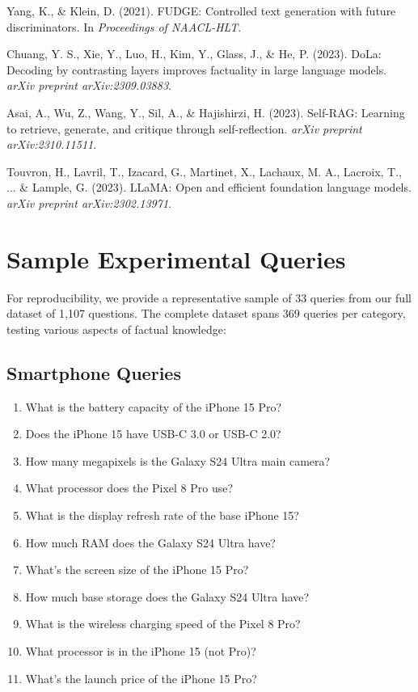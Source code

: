 \documentclass[11pt, a4paper]{article}
\theoremstyle{definition}
\begin{document}
\begin{thebibliography}{99}
Yang, K., \& Klein, D. (2021). 
FUDGE: Controlled text generation with future discriminators. 
In \textit{Proceedings of NAACL-HLT}.

Chuang, Y. S., Xie, Y., Luo, H., Kim, Y., Glass, J., \& He, P. (2023). 
DoLa: Decoding by contrasting layers improves factuality in large language models. 
\textit{arXiv preprint arXiv:2309.03883}.

Asai, A., Wu, Z., Wang, Y., Sil, A., \& Hajishirzi, H. (2023). 
Self-RAG: Learning to retrieve, generate, and critique through self-reflection. 
\textit{arXiv preprint arXiv:2310.11511}.

Touvron, H., Lavril, T., Izacard, G., Martinet, X., Lachaux, M. A., Lacroix, T., ... \& Lample, G. (2023). 
LLaMA: Open and efficient foundation language models. 
\textit{arXiv preprint arXiv:2302.13971}.

\end{thebibliography}

\appendix

\section{Sample Experimental Queries}

For reproducibility, we provide a representative sample of 33 queries from our full dataset of 1,107 questions. The complete dataset spans 369 queries per category, testing various aspects of factual knowledge:

\subsection{Smartphone Queries}
\begin{enumerate}
    \item What is the battery capacity of the iPhone 15 Pro?
    \item Does the iPhone 15 have USB-C 3.0 or USB-C 2.0?
    \item How many megapixels is the Galaxy S24 Ultra main camera?
    \item What processor does the Pixel 8 Pro use?
    \item What is the display refresh rate of the base iPhone 15?
    \item How much RAM does the Galaxy S24 Ultra have?
    \item What's the screen size of the iPhone 15 Pro?
    \item How much base storage does the Galaxy S24 Ultra have?
    \item What is the wireless charging speed of the Pixel 8 Pro?
    \item What processor is in the iPhone 15 (not Pro)?
    \item What's the launch price of the iPhone 15 Pro?
\end{enumerate}
\end{document}

